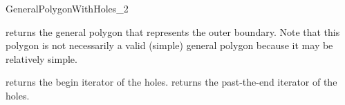 \begin{ccRefConcept}{GeneralPolygonWithHoles_2}
\ccAccessFunctions

{returns the general polygon that represents the outer boundary. Note that this polygon is not necessarily a valid (simple) general polygon because it may be relatively simple.}


{returns the begin iterator of the holes.}
\ccGlue
{}
{returns the past-the-end iterator of the holes.}

\ccHasModels
\\
\\
\\

\end{ccRefConcept}

\ccRefPageEnd

